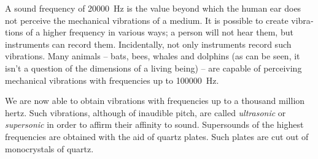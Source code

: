 A sound frequency of \SI{20000}{\hertz} is the value beyond which the human ear does not perceive the mechanical vibrations of a medium. It is possible to create vibra­tions of a higher frequency in various ways; a person will not hear them, but instruments can record them. Inciden­tally, not only instruments record such vibrations. Many animals -- bats, bees, whales and dolphins (as can be seen, it isn’t a question of the dimensions of a living being) -- are capable of perceiving mechanical vibrations with frequencies up to \SI{100000}{\hertz}.

We are now able to obtain vibrations with frequencies up to a thousand million hertz. Such vibrations, although of inaudible pitch, are called \emph{ultrasonic} or \emph{supersonic} in order to affirm their affinity to sound. Supersounds of the highest frequencies are obtained with the aid of quartz plates. Such plates are cut out of monocrystals of quartz.
